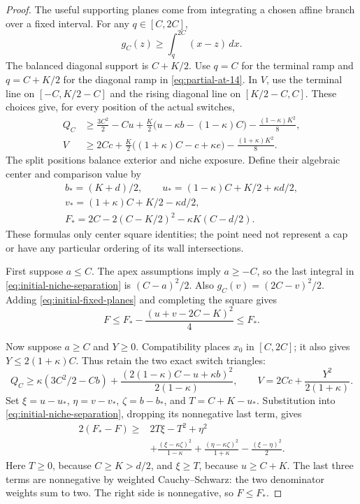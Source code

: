 \begin{proof}
The useful supporting planes come from integrating a chosen affine
branch over a fixed interval. For any \(q\in[C,2C]\),
\[
g_C(z)\ge\int_q^{2C}(x-z)\,dx.
\]
The balanced diagonal support is \(C+K/2\). Use \(q=C\) for the terminal ramp and \(q=C+K/2\) for the diagonal
ramp in \eqref{eq:partial-at-14}. In \(V\), use the terminal line on
\([-C,K/2-C]\) and the rising diagonal line on \([K/2-C,C]\).
These choices give, for every position of the actual switches,
\begin{equation}\label{eq:initial-fixed-planes}
\begin{aligned}
Q_C&\ge\frac{3C^2}{2}-Cu
 +\frac K2\bigl(u-\kappa b-(1-\kappa)C\bigr)
 -\frac{(1-\kappa)K^2}{8},\\
V&\ge2Cc+\frac K2\bigl((1+\kappa)C-c+\kappa e\bigr)
 -\frac{(1+\kappa)K^2}{8}.
\end{aligned}
\end{equation}
The split positions balance exterior and niche exposure. Define their
algebraic center and comparison value by
\begin{equation}\label{eq:partial-at-25}
\begin{gathered}
b_*=(K+d)/2,\qquad
u_*=(1-\kappa)C+K/2+\kappa d/2,\\
v_*=(1+\kappa)C+K/2-\kappa d/2,\\
F_*=2C-2(C-K/2)^2-\kappa K(C-d/2).
\end{gathered}
\end{equation}
These formulas only center square identities; the point need not
represent a cap or have any particular ordering of its wall intersections.

First suppose \(a\le C\). The apex assumptions imply \(a\ge-C\),
so the last integral in \eqref{eq:initial-niche-separation} is
\((C-a)^2/2\). Also \(g_C(v)=(2C-v)^2/2\).
Adding \eqref{eq:initial-fixed-planes} and completing the square gives
\begin{equation}\label{eq:initial-first-square}
F\le F_*-\frac{(u+v-2C-K)^2}{4}\le F_*.
\end{equation}

Now suppose \(a\ge C\) and \(Y\ge0\). Compatibility places
\(x_0\) in \([C,2C]\); it also gives
\(Y\le2(1+\kappa)C\). Thus retain the two exact switch triangles:
\[
Q_C\ge\kappa(3C^2/2-Cb)
 +\frac{(2(1-\kappa)C-u+\kappa b)^2}{2(1-\kappa)},
\qquad
V=2Cc+\frac{Y^2}{2(1+\kappa)}.
\]
Set \(\xi=u-u_*\), \(\eta=v-v_*\), \(\zeta=b-b_*\), and
\(T=C+K-u_*\). Substitution into
\eqref{eq:initial-niche-separation}, dropping its nonnegative last
term, gives
\begin{equation}\label{eq:initial-second-square}
\begin{split}
2(F_*-F)\ge{}&2T\xi-T^2+\eta^2\\
&+\frac{(\xi-\kappa\zeta)^2}{1-\kappa}
 +\frac{(\eta-\kappa\zeta)^2}{1+\kappa}
 -\frac{(\xi-\eta)^2}{2}.
\end{split}
\end{equation}
Here \(T\ge0\), because \(C\ge K>d/2\), and \(\xi\ge T\),
because \(u\ge C+K\). The last three terms are nonnegative by
weighted Cauchy--Schwarz: the two denominator weights sum to two.
The right side is nonnegative, so \(F\le F_*\).


\end{proof}
